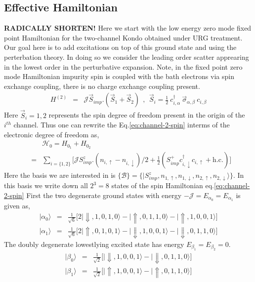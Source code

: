 \documentclass[reprint,prb,superscriptaddress]{revtex4-2}
\begin{document}
\subsection{Effective Hamiltonian}
\textbf{RADICALLY SHORTEN!}
\noindent Here we start with the low energy zero mode fixed point Hamiltonian for the two-channel Kondo obtained under URG treatment. Our goal here is to add excitations on top of this ground state and using the perterbation theory. In doing so we consider the leading order scatter apprearing in the lowest order in the perturbative expansion. Note, in the fixed point zero mode Hamiltonian impurity spin is coupled with the bath electrons via spin exchange coupling, there is no charge exchange coupling present. 
\begin{eqnarray}
H^{(2)}&=& {\mathcal{J}} \vec{S}_{imp}.(\vec{S}_1+\vec{S}_2)~~,~~\vec{S}_i =  \frac{1}{2}~ c_{i,\alpha}^{\dagger}~ \vec{\sigma}_{\alpha,\beta}~ c_{i,\beta}
\label{eq:channel-2-spin}
\end{eqnarray}
Here $\vec{S}_i=1,2$ represents the spin degree of freedom present in the origin of the $i^{th}$ channel. Thus one can rewrite the Eq.\eqref{eq:channel-2-spin} interms of the electronic degree of freedom as,
\begin{eqnarray}
&&\mathcal{H}_0= H_{0_1}+H_{0_2} \nonumber\\
&=&\sum_{i=\{1,2\}}\bigg[ {\mathcal{J}} S^z_{imp}. (n_{i,\uparrow}-n_{i,\downarrow})/2 + \frac{1}{2}  ( S_{imp}^{+} c^{\dagger}_{i,\downarrow} c_{i,\uparrow} + \textrm{h.c.}  )\nonumber \bigg]
\end{eqnarray}
Here the basis we are interested in is $\{\mathcal{B}\}=\{|S^z_{imp},n_{1,\uparrow},n_{1,\downarrow},n_{2,\uparrow},n_{2,\downarrow}\rangle \}$. In this basis we write down all $2^3=8$ states of the spin Hamiltonian eq.\eqref{eq:channel-2-spin}
First the two degenerate ground states with energy $-{\mathcal{J}}= E_{\alpha_0}= E_{\alpha_1}$ is given as,
\begin{eqnarray}
|\alpha_0\rangle &=& \frac{1}{\sqrt{6}} \bigg[2|\Downarrow,1,0,1,0\rangle-|\Uparrow,0,1,1,0\rangle-|\Uparrow,1,0,0,1\rangle\bigg] \nonumber\\
|\alpha_1\rangle &=& \frac{1}{\sqrt{6}} \bigg[2|\Uparrow,0,1,0,1\rangle-|\Downarrow,1,0,0,1\rangle-|\Downarrow,0,1,1,0\rangle\bigg] \nonumber
\end{eqnarray}
The doubly degenerate lowestlying excited state has energy $E_{\beta_1}=E_{\beta_2}=0$.
\begin{eqnarray}
|\beta_0\rangle &=& \frac{1}{\sqrt{2}}\bigg[|\Downarrow,1,0,0,1\rangle-|\Downarrow,0,1,1,0\rangle \bigg] \nonumber\\
|\beta_1\rangle &=& \frac{1}{\sqrt{2}} \bigg[ |\Uparrow,1,0,0,1\rangle-|\Uparrow,0,1,1,0\rangle \bigg]
\end{eqnarray}
\end{document}
